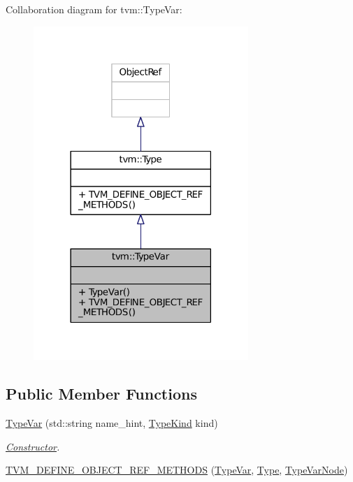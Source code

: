 Collaboration diagram for tvm\+:\+:Type\+Var\+:
\nopagebreak
\begin{figure}[H]
\begin{center}
\leavevmode
\includegraphics[width=230pt]{classtvm_1_1TypeVar__coll__graph}
\end{center}
\end{figure}
\subsection*{Public Member Functions}
\begin{DoxyCompactItemize}
\item 
\hyperlink{classtvm_1_1TypeVar_acb27d306dde646c3494c49a16e670ba3}{Type\+Var} (std\+::string name\+\_\+hint, \hyperlink{namespacetvm_acd267f8d7f55da6ac681239831963279}{Type\+Kind} kind)
\begin{DoxyCompactList}\small\item\em \hyperlink{classtvm_1_1Constructor}{Constructor}. \end{DoxyCompactList}\item 
\hyperlink{classtvm_1_1TypeVar_a4b02dd0fd1647b4544c1988c6c2f9909}{T\+V\+M\+\_\+\+D\+E\+F\+I\+N\+E\+\_\+\+O\+B\+J\+E\+C\+T\+\_\+\+R\+E\+F\+\_\+\+M\+E\+T\+H\+O\+DS} (\hyperlink{classtvm_1_1TypeVar}{Type\+Var}, \hyperlink{classtvm_1_1Type}{Type}, \hyperlink{classtvm_1_1TypeVarNode}{Type\+Var\+Node})
\end{DoxyCompactItemize}


